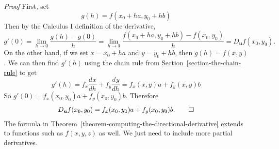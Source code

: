 \documentclass[10pt,]{book}
\makeatletter
\renewcommand*{\proofname}{Proof}
\renewenvironment{proof}[1][\proofname]{\par
  \pushQED{\qed}%
  \normalfont \topsep6\p@\@plus6\p@\relax
  \trivlist
  \item\relax
    {\itshape
    #1\@addpunct{.}}\hspace\labelsep\ignorespaces
}{%
  \popQED\endtrivlist\@endpefalse
}
\numberwithin{equation}{section}
\newcommand{\vv}[1]{\mathbf{#1}}
\newcommand{\dv}[3][]{\dfrac{d^{#1} #2}{d #3^{#1}}}
\makeatother
\begin{document}
\begin{proof}\hypertarget{proof-16}{}
\hypertarget{p-1400}{}%
First, set%
\begin{equation*}
g(h) = f(x_{0}+ha, y_{0} +hb)
\end{equation*}
Then by the Calculus I definition of the derivative,%
\begin{equation*}
g'(0) = \lim_{h\to0}\frac{g(h) - g(0)}{h} = \lim_{h\to0}\frac{f(x_{0}+ha, y_{0}+hb) - f(x_{0},y_{0})}{h} = D_{\vv{u}}f(x_{0},y_{0}).
\end{equation*}
On the other hand, if we set \(x = x_{0} + ha\) and \(y = y_{0} + hb\), then \(g(h) = f(x,y)\). We can then find \(g'(h)\) using the chain rule from \hyperref[section-the-chain-rule]{Section~\ref{section-the-chain-rule}} to get%
\begin{equation*}
g'(h) = f_{x}\dv{x}{h} + f_{y}\dv{y}{h} = f_{x}(x,y)a + f_{y}(x,y)b
\end{equation*}
So \(g'(0) = f_{x}(x_{0},y_{0})a + f_{y}(x_{0},y_{0})b.\) Therefore%
\begin{equation*}
D_{\vv{u}}f(x_{0},y_{0}) = f_{x}(x_{0},y_{0})a + f_{y}(x_{0},y_{0})b.\qedhere
\end{equation*}
%
\end{proof}
\hypertarget{p-1401}{}%
The formula in \hyperref[theorem-computing-the-directional-derivative]{Theorem~\ref{theorem-computing-the-directional-derivative}} extends to functions such as \(f(x,y,z)\) as well. We just need to include more partial derivatives.%
\end{document}
